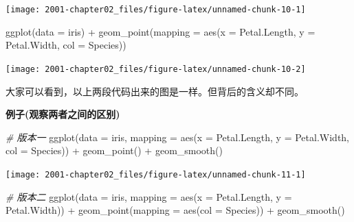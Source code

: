 \documentclass[
]{book}
\newenvironment{Shaded}{\begin{snugshade}}{\end{snugshade}}
\newcommand{\AttributeTok}[1]{\textcolor[rgb]{0.77,0.63,0.00}{#1}}
\newcommand{\CommentTok}[1]{\textcolor[rgb]{0.56,0.35,0.01}{\textit{#1}}}
\newcommand{\FunctionTok}[1]{\textcolor[rgb]{0.00,0.00,0.00}{#1}}
\newcommand{\NormalTok}[1]{#1}
\newcommand{\SpecialCharTok}[1]{\textcolor[rgb]{0.00,0.00,0.00}{#1}}
\begin{document}
\begin{center}\texttt{[image: 2001-chapter02\_files/figure-latex/unnamed-chunk-10-1]} \end{center}

\begin{Shaded}
\begin{Highlighting}[]
\FunctionTok{ggplot}\NormalTok{(}\AttributeTok{data =}\NormalTok{ iris) }\SpecialCharTok{+} \FunctionTok{geom\_point}\NormalTok{(}\AttributeTok{mapping =} \FunctionTok{aes}\NormalTok{(}\AttributeTok{x =}\NormalTok{ Petal.Length, }\AttributeTok{y =}\NormalTok{ Petal.Width, }
    \AttributeTok{col =}\NormalTok{ Species))}
\end{Highlighting}
\end{Shaded}

\begin{center}\texttt{[image: 2001-chapter02\_files/figure-latex/unnamed-chunk-10-2]} \end{center}

大家可以看到，以上两段代码出来的图是一样。但背后的含义却不同。

\textbf{例子(观察两者之间的区别)}

\begin{Shaded}
\begin{Highlighting}[]
\CommentTok{\# 版本一}
\FunctionTok{ggplot}\NormalTok{(}\AttributeTok{data =}\NormalTok{ iris, }\AttributeTok{mapping =} \FunctionTok{aes}\NormalTok{(}\AttributeTok{x =}\NormalTok{ Petal.Length, }\AttributeTok{y =}\NormalTok{ Petal.Width, }\AttributeTok{col =}\NormalTok{ Species)) }\SpecialCharTok{+} 
    \FunctionTok{geom\_point}\NormalTok{() }\SpecialCharTok{+} \FunctionTok{geom\_smooth}\NormalTok{()}
\end{Highlighting}
\end{Shaded}

\begin{center}\texttt{[image: 2001-chapter02\_files/figure-latex/unnamed-chunk-11-1]} \end{center}

\begin{Shaded}
\begin{Highlighting}[]
\CommentTok{\# 版本二}
\FunctionTok{ggplot}\NormalTok{(}\AttributeTok{data =}\NormalTok{ iris, }\AttributeTok{mapping =} \FunctionTok{aes}\NormalTok{(}\AttributeTok{x =}\NormalTok{ Petal.Length, }\AttributeTok{y =}\NormalTok{ Petal.Width)) }\SpecialCharTok{+} \FunctionTok{geom\_point}\NormalTok{(}\AttributeTok{mapping =} \FunctionTok{aes}\NormalTok{(}\AttributeTok{col =}\NormalTok{ Species)) }\SpecialCharTok{+} 
    \FunctionTok{geom\_smooth}\NormalTok{()}
\end{Highlighting}
\end{Shaded}
\end{document}
